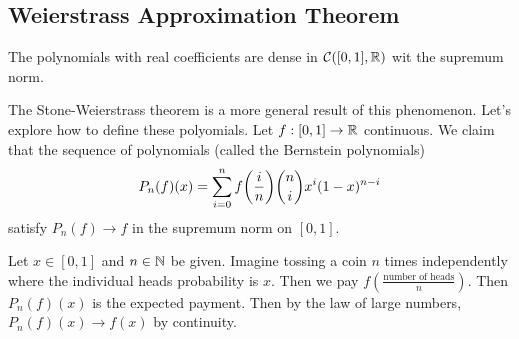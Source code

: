 \subsection{Weierstrass Approximation Theorem}
\begin{theorem}
    The polynomials with real coefficients are dense in $\mathcal{C}([0, 1], \operatorname{\mathbb{R}})$
    wit the supremum norm.
\end{theorem}
The Stone-Weierstrass theorem is a more general result of this phenomenon.
Let's explore how to define these polyomials. Let $f : [0, 1] \to \operatorname{\mathbb{R}}$ continuous.
We claim that the sequence of polynomials (called the Bernstein polynomials)
\[ P_n(f)(x) = \sum_{i = 0}^n f\qty(\frac{i}{n}) \binom{n}{i} x^i (1-x)^{n - i} \]
satisfy $P_n(f) \to f$ in the supremum norm on $[0, 1]$.

Let $x \in [0, 1]$ and $n \in \operatorname{\mathbb{N}}$ be given. Imagine tossing a coin $n$ times
independently where the individual heads probability is $x$. Then we pay $f(\frac{\text{number of heads}}{n})$.
Then $P_n(f)(x)$ is the expected payment. Then by the law of large numbers, $P_n(f)(x) \to f(x)$ by continuity.